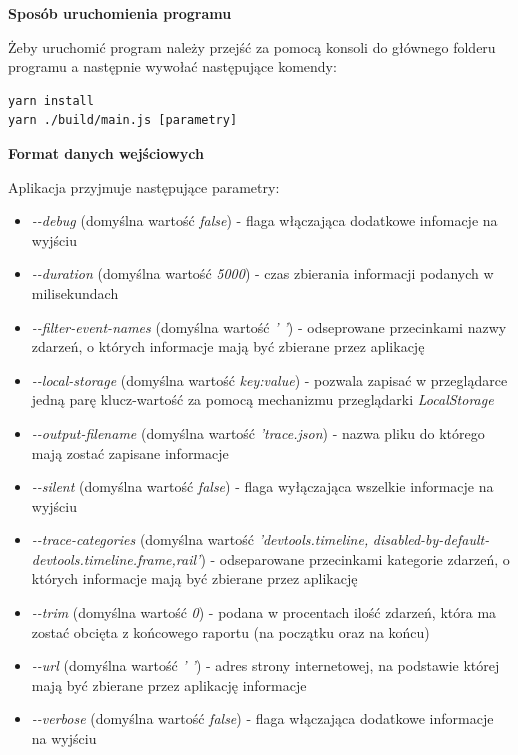 \documentclass[polish, twoside, 12pt]{mwart}
\begin{document}
\textbf{Sposób uruchomienia programu} \newline

Żeby uruchomić program należy przejść za pomocą konsoli do głównego folderu programu a następnie wywołać następujące komendy:

\begin{lstlisting}
yarn install
yarn ./build/main.js [parametry]
\end{lstlisting}

\textbf{Format danych wejściowych} \newline

Aplikacja przyjmuje następujące parametry:

\begin{itemize}
  \item \emph{-{}-debug} (domyślna wartość \emph{false}) - flaga włączająca dodatkowe infomacje na wyjściu
  \item \emph{-{}-duration} (domyślna wartość \emph{5000}) - czas zbierania informacji podanych w milisekundach
  \item \emph{-{}-filter-event-names} (domyślna wartość \emph{' '}) - odseprowane przecinkami nazwy zdarzeń, o których informacje mają być zbierane przez aplikację
  \item \emph{-{}-local-storage} (domyślna wartość \emph{key:value}) - pozwala zapisać w przeglądarce jedną parę klucz-wartość za pomocą mechanizmu przeglądarki \emph{LocalStorage}
  \item \emph{-{}-output-filename} (domyślna wartość \emph{'trace.json}) - nazwa pliku do którego mają zostać zapisane informacje
  \item \emph{-{}-silent} (domyślna wartość \emph{false}) - flaga wyłączająca wszelkie informacje na wyjściu
  \item \emph{-{}-trace-categories} (domyślna wartość \emph{'devtools.timeline,} \newline \emph{disabled-by-default-devtools.timeline.frame,rail'}) - odseparowane przecinkami kategorie zdarzeń, o których informacje mają być zbierane przez aplikację
  \item \emph{-{}-trim} (domyślna wartość \emph{0}) - podana w procentach ilość zdarzeń, która ma zostać obcięta z końcowego raportu (na początku oraz na końcu)
  \item \emph{-{}-url} (domyślna wartość \emph{' '}) - adres strony internetowej, na podstawie której mają być zbierane przez aplikację informacje
  \item \emph{-{}-verbose} (domyślna wartość \emph{false}) - flaga włączająca dodatkowe informacje na wyjściu
\end{itemize}
\end{document}
